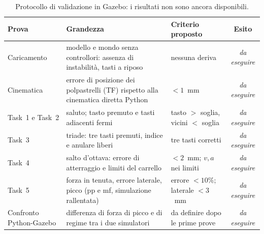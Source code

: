 \begin{table}[htbp]
    \centering
    \renewcommand{\arraystretch}{1.15}
    \footnotesize
    \begin{tabular}{|p{3.6cm}|p{5.2cm}|p{3.2cm}|c|}
        \hline
        Prova & Grandezza & Criterio proposto & Esito\\ \hline \hline
        Caricamento & modello e mondo senza controllori: assenza di instabilità, tasti a riposo & nessuna deriva & \textit{da eseguire}\\
        Cinematica & errore di posizione dei polpastrelli (TF) rispetto alla cinematica diretta Python & $<1$~mm & \textit{da eseguire}\\
        Task~1 e Task~2 & saluto; tasto premuto e tasti adiacenti fermi & tasto $>$ soglia, vicini $<$ soglia & \textit{da eseguire}\\
        Task~3 & triade: tre tasti premuti, indice e anulare liberi & tre tasti corretti & \textit{da eseguire}\\
        Task~4 & salto d'ottava: errore di atterraggio e limiti del carrello & $<2$~mm; $v,a$ nei limiti & \textit{da eseguire}\\
        Task~5 & forza in tenuta, errore laterale, picco (pp e mf, simulazione rallentata) & errore $<10\%$; laterale $<3$~mm & \textit{da eseguire}\\
        Confronto Python-Gazebo & differenza di forza di picco e di regime tra i due simulatori & da definire dopo le prime prove & \textit{da eseguire}\\ \hline
    \end{tabular}
    \caption{Protocollo di validazione in Gazebo: i risultati non sono ancora disponibili.}
    \label{tab:gz_protocol}
\end{table}
